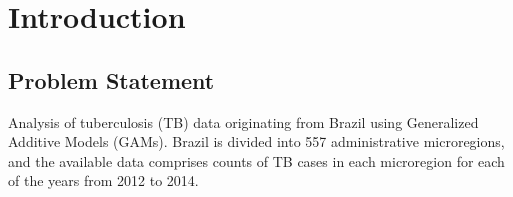 \section{Introduction}

\subsection{Problem Statement}
Analysis of tuberculosis (TB) data originating from Brazil using Generalized Additive Models (GAMs). Brazil is divided into 557 administrative microregions, and the available data
comprises counts of TB cases in each microregion for each of the years from 2012 to 2014.